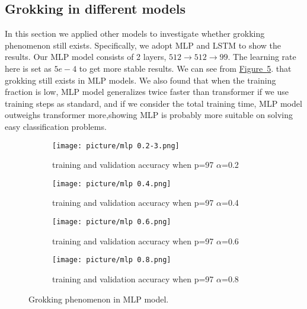 \documentclass{article}
\begin{document}
\subsection{Grokking in different models}
\vspace{-1em}
In this section we applied other models to investigate whether grokking phenomenon still exists. Specifically, we adopt MLP and LSTM to show the results. Our MLP model consists of 2 layers, $512 \rightarrow 512 \rightarrow 99$. The learning rate here is set as $5e-4$ to get more stable results. We can see from \hyperref[fig3:main]{Figure~\ref{fig3:main}}. that grokking still exists in MLP models. We also found that when the training fraction is low, MLP model generalizes twice faster than transformer if we use training steps as standard, and if we consider the total training time, MLP model outweighs transformer more,showing MLP is probably more suitable on solving easy classification problems.

\begin{figure}[htbp]
  \centering
   \begin{subfigure}[b]{0.22\textwidth}
        \centering
    \texttt{[image: picture/mlp 0.2-3.png]}
    \caption{training and validation accuracy when p=97 $\alpha$=0.2}
    \label{fig3:sub1}
  \end{subfigure}
  \hspace{0.5em} %
     \begin{subfigure}[b]{0.22\textwidth}
        \centering
    \texttt{[image: picture/mlp 0.4.png]}
    \caption{training and validation accuracy when p=97 $\alpha$=0.4}
    \label{fig3:sub2}
  \end{subfigure}
  \hspace{0.5em} %
     \begin{subfigure}[b]{0.22\textwidth}
        \centering
    \texttt{[image: picture/mlp 0.6.png]}
    \caption{training and validation accuracy when p=97 $\alpha$=0.6}
    \label{fig3:sub3}
  \end{subfigure}
  \hspace{0.5em} %
    \begin{subfigure}[b]{0.22\textwidth}
        \centering
    \texttt{[image: picture/mlp 0.8.png]}
    \caption{training and validation accuracy when p=97 $\alpha$=0.8}
    \label{fig3:sub4}
  \end{subfigure}
  
  \renewcommand{\figurename}{Figure}
  \caption{Grokking phenomenon in MLP model.}
  \label{fig3:main}
  \vspace{-1em}
\end{figure}
\end{document}
